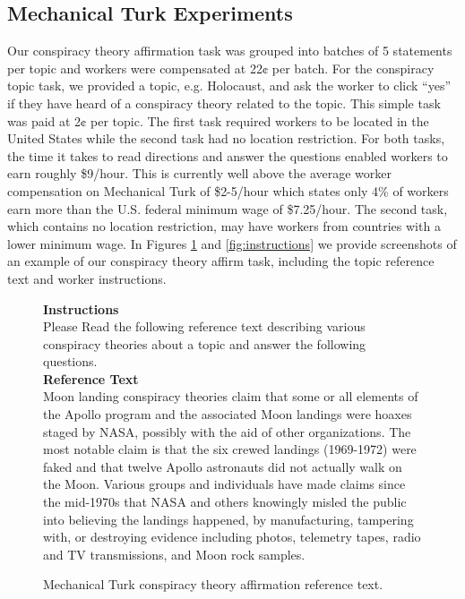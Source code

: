 \documentclass[11pt,a4paper]{article}
\begin{document}
\subsection{Mechanical Turk Experiments}
Our conspiracy theory affirmation task was grouped into batches of 5 statements per topic and workers were compensated at 22¢ per batch. For the conspiracy topic task, we provided a topic, e.g. Holocaust, and ask the worker to click ``yes'' if they have heard of a conspiracy theory related to the topic. This simple task was paid at 2¢ per topic. The first task required workers to be located in the United States while the second task had no location restriction. For both tasks, the time it takes to read directions and answer the questions enabled workers to earn roughly \$9/hour. This is currently well above the average worker compensation on Mechanical Turk of \$2-5/hour \cite{10.1145/3173574.3174023,hitlin2016research} which states only 4\% of workers earn more than the U.S. federal minimum wage of \$7.25/hour. The second task, which contains no location restriction, may have workers from countries with a lower minimum wage. In Figures \ref{fig:ref} and \ref{fig:instructions} we provide screenshots of an example of our conspiracy theory affirm task, including the topic reference text and worker instructions. 


\begin{figure}[h]
	\centering
    \begin{mdframed}
    {\large \textbf{Instructions}}\vspace{2pt}\\
    {\small Please Read the following reference text describing various conspiracy theories about a topic and answer the following questions.}\\
    {\textbf{Reference Text}}\vspace{2pt}\\
    {\small Moon landing conspiracy theories claim that some or all elements of the Apollo program and the associated Moon landings were hoaxes staged by NASA, possibly with the aid of other organizations. The most notable claim is that the six crewed landings (1969-1972) were faked and that twelve Apollo astronauts did not actually walk on the Moon. Various groups and individuals have made claims since the mid-1970s that NASA and others knowingly misled the public into believing the landings happened, by manufacturing, tampering with, or destroying evidence including photos, telemetry tapes, radio and TV transmissions, and Moon rock samples.}
    \end{mdframed}	\caption{Mechanical Turk conspiracy theory affirmation reference text.}
	\label{fig:ref}
\end{figure}
\end{document}
